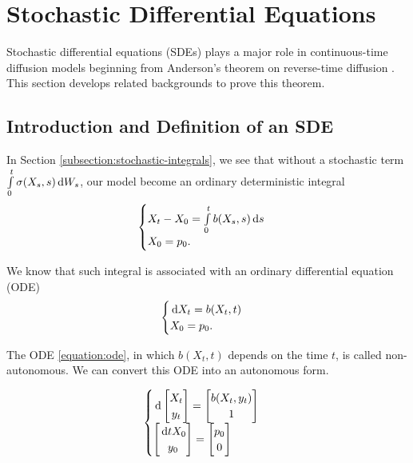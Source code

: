 \section{Stochastic Differential Equations}
Stochastic differential equations (SDEs) plays a major role in continuous-time diffusion models beginning from Anderson's theorem on reverse-time diffusion \cite{anderson1982reverse}. This section develops related backgrounds to prove this theorem.

\subsection{Introduction and Definition of an SDE}

In Section \ref{subsection:stochastic-integrals}, we see that without  a stochastic term $\int\limits_0^t \sigma(X_s,s)\,\mathrm{d} W_s$, our model become an ordinary deterministic integral
\begin{equation}
  \label{equation:ordinary-integral}
  \begin{cases}
    X_t - X_0 = \int\limits_0^t b(X_s,s)\,\mathrm{d} s \\
    X_0 = p_0.
  \end{cases}
\end{equation}

We know that such integral is associated with an ordinary differential equation (ODE)
\begin{equation}
  \label{equation:ode}
  \begin{cases}
    \,\mathrm{d} X_t = b(X_t,t) \\
    X_0 = p_0.
  \end{cases}
\end{equation}

The ODE \ref{equation:ode}, in which $b(X_t,t)$ depends on the time $t$, is called non-autonomous. We can convert this ODE into an autonomous form.

\begin{equation}
  \label{equation:autonomous-ode}
  \begin{cases}
    \,\mathrm{d} \begin{bmatrix}
         X_t \\ y_t
       \end{bmatrix} = \begin{bmatrix}
                         b(X_t,y_t) \\ 1
                       \end{bmatrix} \\
    \begin{bmatrix}\,\mathrm{d} t
      X_0 \\ y_0
    \end{bmatrix} = \begin{bmatrix}
                      p_0 \\ 0
                    \end{bmatrix}
  \end{cases}
\end{equation}

